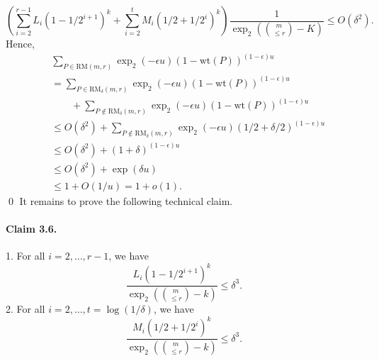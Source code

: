 \[\left(\sum_{i=2}^{r-1}L_i(1-1/2^{i+1})^k+\sum_{i=2}^tM_i(1/2+1/2^i)^k\right)\frac1{\operatorname{exp}_2\left(\binom m{\le r}-K\right)}\le O(\delta^2).\]
Hence,
\begin{align*}&\sum_{P\in\mathrm{RM}(m,r)}\operatorname{exp}_2(-\epsilon u)(1-\mathrm{wt}(P))^{(1-\epsilon)u}\\&=\sum_{P\in\mathrm{RM}_\delta(m,r)}\operatorname{exp}_2(-\epsilon u)(1-\mathrm{wt}(P))^{(1-\epsilon)u}\\&\qquad+\sum_{P\notin\mathrm{RM}_\delta(m,r)}\operatorname{exp}_2(-\epsilon u)(1-\mathrm{wt}(P))^{(1-\epsilon)u}\\&\le O(\delta^2)+\sum_{P\notin\mathrm{RM}_\delta(m,r)}\operatorname{exp}_2(-\epsilon u)(1/2+\delta/2)^{(1-\epsilon)u}\\&\le O(\delta^2)+(1+\delta)^{(1-\epsilon)u}\\&\le O(\delta^2)+\exp(\delta u)\\&\le1+O(1/u)=1+o(1).\end{align*}\qed
It remains to prove the following technical claim.
\paragraph{Claim 3.6.} 1. For all $i=2,\ldots,r-1$, we have
\[\frac{L_i(1-1/2^{i+1})^k}{\operatorname{exp}_2\left(\binom m{\le r}-k\right)}\le\delta^3.\]
2. For all $i=2,\ldots,t=\log(1/\delta)$, we have
\[\frac{M_i(1/2+1/2^i)^k}{\operatorname{exp}_2\left(\binom m{\le r}-k\right)}\le\delta^3.\]
